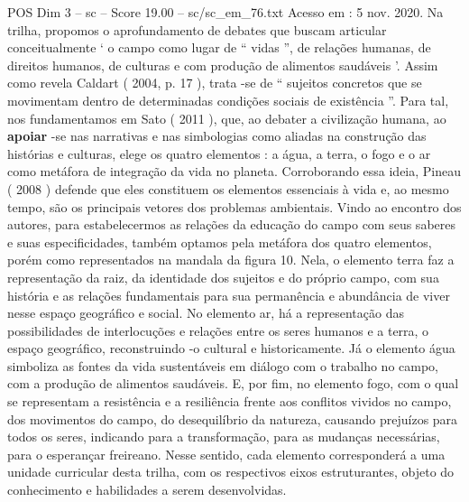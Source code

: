 \begin{textsample}{POS Dim 3 – sc – Score 19.00 – sc/sc\_em\_76.txt}
Acesso em : 5 nov. 2020.
Na trilha, propomos o aprofundamento de debates que buscam articular conceitualmente ‘ o campo como lugar de “ vidas ”, de relações humanas, de direitos humanos, de culturas e com produção de alimentos saudáveis ’.
Assim como revela Caldart ( 2004, p. 17 ), trata -se de “ sujeitos concretos que se movimentam dentro de determinadas condições sociais de existência ”.
Para tal, nos fundamentamos em Sato ( 2011 ), que, ao debater a civilização humana, ao \textbf{apoiar} -se nas narrativas e nas simbologias como aliadas na construção das histórias e culturas, elege os quatro elementos : a água, a terra, o fogo e o ar como metáfora de integração da vida no planeta.
Corroborando essa ideia, Pineau ( 2008 ) defende que eles constituem os elementos essenciais à vida e, ao mesmo tempo, são os principais vetores dos problemas ambientais.
Vindo ao encontro dos autores, para estabelecermos as relações da educação do campo com seus saberes e suas especificidades, também optamos pela metáfora dos quatro elementos, porém como representados na mandala da figura 10.
Nela, o elemento terra faz a representação da raiz, da identidade dos sujeitos e do próprio campo, com sua história e as relações fundamentais para sua permanência e abundância de viver nesse espaço geográfico e social.
No elemento ar, há a representação das possibilidades de interlocuções e relações entre os seres humanos e a terra, o espaço geográfico, reconstruindo -o cultural e historicamente.
Já o elemento água simboliza as fontes da vida sustentáveis em diálogo com o trabalho no campo, com a produção de alimentos saudáveis.
E, por fim, no elemento fogo, com o qual se representam a resistência e a resiliência frente aos conflitos vividos no campo, dos movimentos do campo, do desequilíbrio da natureza, causando prejuízos para todos os seres, indicando para a transformação, para as mudanças necessárias, para o esperançar freireano.
Nesse sentido, cada elemento corresponderá a uma unidade curricular desta trilha, com os respectivos eixos estruturantes, objeto do conhecimento e habilidades a serem desenvolvidas.

\end{textsample}

